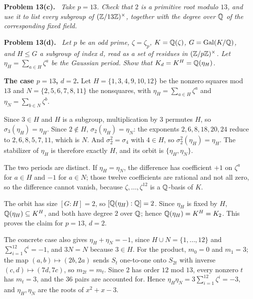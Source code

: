 \documentclass[11pt]{article}
\newenvironment{problem}[1]
  {\par\medskip\noindent\textbf{Problem #1.}\ \itshape}
  {\par\medskip}
\begin{document}
\begin{problem}{13(c)}
Take $p=13$. Check that $2$ is a primitive root modulo $13$, and use it to list every subgroup of $(\mathbb{Z}/13\mathbb{Z})^\times$, together with the degree over $\mathbb{Q}$ of the corresponding fixed field.
\end{problem}

\begin{problem}{13(d)}
Let $p$ be an odd prime, $\zeta=\zeta_p$, $K=\mathbb{Q}(\zeta)$, $G=\operatorname{Gal}(K/\mathbb{Q})$, and $H\le G$ a subgroup of index $d$, read as a set of residues in $(\mathbb{Z}/p\mathbb{Z})^\times$. Let $\eta_H=\sum_{a\in H}\zeta^a$ be the Gaussian period. Show that $K_d=K^H=\mathbb{Q}(\eta_H)$.
\end{problem}
\textbf{The case $p=13$, $d=2$.} Let $H=\{1,3,4,9,10,12\}$ be the nonzero squares mod $13$ and $N=\{2,5,6,7,8,11\}$ the nonsquares, with $\eta_H=\sum_{a\in H}\zeta^a$ and $\eta_N=\sum_{b\in N}\zeta^b$.

Since $3\in H$ and $H$ is a subgroup, multiplication by $3$ permutes $H$, so $\sigma_3(\eta_H)=\eta_H$. Since $2\notin H$, $\sigma_2(\eta_H)=\eta_N$: the exponents $2,6,8,18,20,24$ reduce to $2,6,8,5,7,11$, which is $N$. And $\sigma_2^2=\sigma_4$ with $4\in H$, so $\sigma_2^2(\eta_H)=\eta_H$. The stabilizer of $\eta_H$ is therefore exactly $H$, and its orbit is $\{\eta_H,\eta_N\}$.

The two periods are distinct. If $\eta_H=\eta_N$, the difference has coefficient $+1$ on $\zeta^a$ for $a\in H$ and $-1$ for $a\in N$; those twelve coefficients are rational and not all zero, so the difference cannot vanish, because $\zeta,\dots,\zeta^{12}$ is a $\mathbb{Q}$-basis of $K$.

The orbit has size $[G:H]=2$, so $[\mathbb{Q}(\eta_H):\mathbb{Q}]=2$. Since $\eta_H$ is fixed by $H$, $\mathbb{Q}(\eta_H)\subseteq K^H$, and both have degree $2$ over $\mathbb{Q}$; hence $\mathbb{Q}(\eta_H)=K^H=K_2$. This proves the claim for $p=13$, $d=2$.

The concrete case also gives $\eta_H+\eta_N=-1$, since $H\cup N=\{1,\dots,12\}$ and $\sum_{i=1}^{12}\zeta^i=-1$, and $3N=N$ because $3\in H$. For the product, $m_0=0$ and $m_1=3$; the map $(a,b)\mapsto(2b,2a)$ sends $S_t$ one-to-one onto $S_{2t}$ with inverse $(c,d)\mapsto(7d,7c)$, so $m_{2t}=m_t$. Since $2$ has order $12$ mod $13$, every nonzero $t$ has $m_t=3$, and the $36$ pairs are accounted for. Hence $\eta_H\eta_N=3\sum_{i=1}^{12}\zeta^i=-3$, and $\eta_H,\eta_N$ are the roots of $x^2+x-3$.
\end{document}
